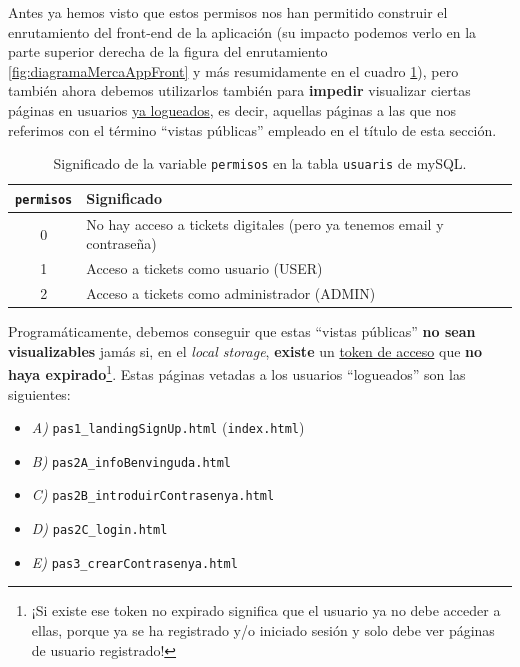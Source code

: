 \documentclass[a4paper,12pt]{report}
\begin{document}
	Antes ya hemos visto que estos permisos nos han permitido construir el enrutamiento del front-end de la aplicación (su impacto podemos verlo en la parte superior derecha de la figura del enrutamiento \ref{fig:diagramaMercaAppFront} y más resumidamente en el cuadro \ref{table:permisos}), pero también ahora debemos utilizarlos también para \textbf{impedir} visualizar ciertas páginas en usuarios \underline{ya logueados}, es decir, aquellas páginas a las que nos referimos con el término ``vistas públicas'' empleado en el título de esta sección.
	
	\begin{table}[H]
		\centering
		\caption{Significado de la variable \texttt{permisos} en la tabla \texttt{usuaris} de mySQL.}
		\begin{tabular}{|c|l|}
			\hline
			\textbf{\texttt{permisos}} & \textbf{Significado} \\
			\hline
			0 & No hay acceso a tickets digitales (pero ya tenemos email y contraseña) \\
			1 & Acceso a tickets como usuario (USER) \\
			2 & Acceso a tickets como administrador (ADMIN) \\
			\hline
		\end{tabular}
		\label{table:permisos}
		
	\end{table}
	
	Programáticamente, debemos conseguir que estas ``vistas públicas'' \textbf{no sean visualizables} jamás si, en el \textit{local storage}, \textbf{existe}  un \underline{token de acceso} que \textbf{no haya expirado}\footnote{¡Si existe ese token no expirado significa que el usuario ya no debe acceder a ellas, porque ya se ha registrado y/o iniciado sesión y solo debe ver páginas de usuario registrado!}. Estas páginas vetadas a los usuarios ``logueados'' son las siguientes:
	
	\vspace{0em}
	\begin{itemize}
		\setlength{\itemsep}{-.5em}
		\item \textit{A)} \texttt{pas1\_landingSignUp.html} (\texttt{index.html})
		\item \textit{B)} \texttt{pas2A\_infoBenvinguda.html}
		\item \textit{C)} \texttt{pas2B\_introduirContrasenya.html}
		\item \textit{D)} \texttt{pas2C\_login.html}
		\item \textit{E)} \texttt{pas3\_crearContrasenya.html}
	\end{itemize}
	
\end{document}
